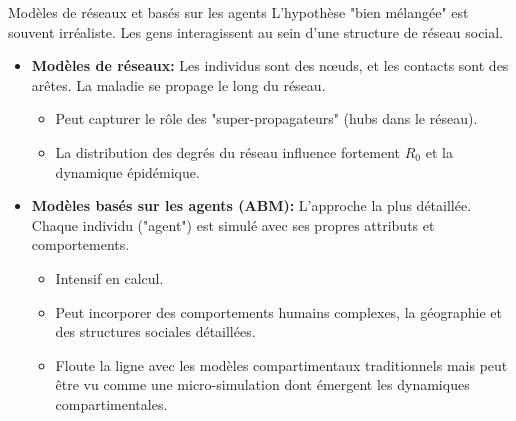 \documentclass[aspectratio=169]{beamer}\usepackage[]{graphicx}\usepackage[]{xcolor}
\begin{document}
\begin{frame}{Modèles de réseaux et basés sur les agents}
    L'hypothèse "bien mélangée" est souvent irréaliste. Les gens interagissent au sein d'une structure de réseau social.
    \begin{itemize}
        \item \textbf{Modèles de réseaux:} Les individus sont des nœuds, et les contacts sont des arêtes. La maladie se propage le long du réseau.
        \begin{itemize}
            \item Peut capturer le rôle des "super-propagateurs" (hubs dans le réseau).
            \item La distribution des degrés du réseau influence fortement $R_0$ et la dynamique épidémique.
        \end{itemize}
        \item \textbf{Modèles basés sur les agents (ABM):} L'approche la plus détaillée. Chaque individu ("agent") est simulé avec ses propres attributs et comportements.
        \begin{itemize}
            \item Intensif en calcul.
            \item Peut incorporer des comportements humains complexes, la géographie et des structures sociales détaillées.
            \item Floute la ligne avec les modèles compartimentaux traditionnels mais peut être vu comme une micro-simulation dont émergent les dynamiques compartimentales.
        \end{itemize}
    \end{itemize}
\end{frame}
\end{document}
